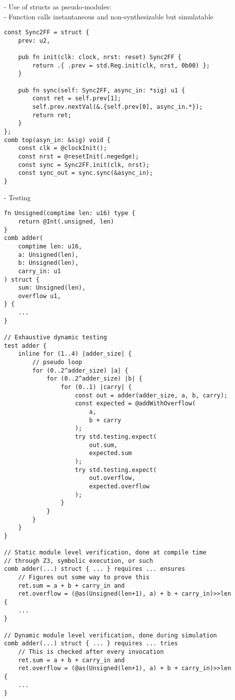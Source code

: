 \documentclass[10pt]{article}
\begin{document}
- Use of structs as pseudo-modules: \\
- Function calls instantaneous and non-synthesizable but simulatable

\begin{verbatim}
const Sync2FF = struct {
    prev: u2,

    pub fn init(clk: clock, nrst: reset) Sync2FF {
        return .{ .prev = std.Reg.init(clk, nrst, 0b00) };
    }

    pub fn sync(self: Sync2FF, async_in: *sig) u1 {
        const ret = self.prev[1];
        self.prev.nextVal(&.{self.prev[0], async_in.*});
        return ret;
    }
};
comb top(asyn_in: &sig) void {
    const clk = @clockInit();
    const nrst = @resetInit(.negedge);
    const sync = Sync2FF.init(clk, nrst);
    const sync_out = sync.sync(&async_in);
}
\end{verbatim}

- Testing

\begin{verbatim}
fn Unsigned(comptime len: u16) type {
    return @Int(.unsigned, len)
}
comb adder(
    comptime len: u16,
    a: Unsigned(len),
    b: Unsigned(len),
    carry_in: u1
) struct {
    sum: Unsigned(len),
    overflow u1,
} {
    ...
}

// Exhaustive dynamic testing
test adder {
    inline for (1..4) |adder_size| {
        // pseudo loop
        for (0..2^adder_size) |a| {
            for (0..2^adder_size) |b| {
                for (0..1) |carry| {
                    const out = adder(adder_size, a, b, carry);
                    const expected = @addWithOverflow(
                        a,
                        b + carry
                    );
                    try std.testing.expect(
                        out.sum,
                        expected.sum
                    );
                    try std.testing.expect(
                        out.overflow,
                        expected.overflow
                    );
                }
            }
        }
    }
}

// Static module level verification, done at compile time
// through Z3, symbolic execution, or such
comb adder(...) struct { ... } requires ... ensures 
    // Figures out some way to prove this
    ret.sum = a + b + carry_in and
    ret.overflow = (@as(Unsigned(len+1), a) + b + carry_in)>>len 
{
    ...
}

// Dynamic module level verification, done during simulation
comb adder(...) struct { ... } requires ... tries 
    // This is checked after every invocation
    ret.sum = a + b + carry_in and
    ret.overflow = (@as(Unsigned(len+1), a) + b + carry_in)>>len 
{
    ...
}
\end{verbatim}
\end{document}
